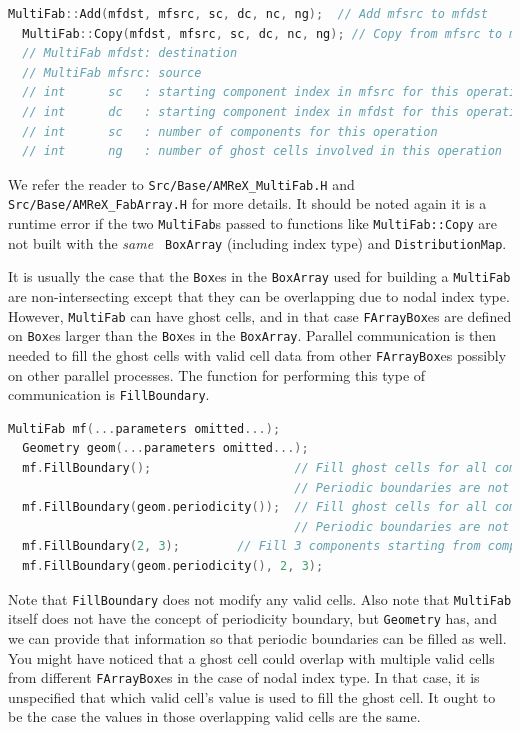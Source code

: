 {{{\begin{lstlisting}[language=cpp]
  MultiFab::Add(mfdst, mfsrc, sc, dc, nc, ng);  // Add mfsrc to mfdst
  MultiFab::Copy(mfdst, mfsrc, sc, dc, nc, ng); // Copy from mfsrc to mfdst
  // MultiFab mfdst: destination 
  // MultiFab mfsrc: source
  // int      sc   : starting component index in mfsrc for this operation
  // int      dc   : starting component index in mfdst for this operation
  // int      sc   : number of components for this operation
  // int      ng   : number of ghost cells involved in this operation
\end{lstlisting}
We refer the reader to {\tt Src/Base/AMReX\_MultiFab.H} and {\tt
  Src/Base/AMReX\_FabArray.H} for more details.  It should be noted
again it is a runtime error if the two {\tt MultiFab}s passed to functions
like {\tt MultiFab::Copy} are not built with the {\emph{same}} {\tt
  BoxArray} (including index type) and {\tt DistributionMap}. 

It is usually the case that the {\tt Box}es in the {\tt BoxArray} used
for building a {\tt MultiFab} are non-intersecting except that they
can be overlapping due to nodal index type.  However, {\tt MultiFab}
can have ghost cells, and in that case {\tt FArrayBox}es are defined
on {\tt Box}es larger than the {\tt Box}es in the {\tt BoxArray}.
Parallel communication is then needed to fill the ghost cells with
valid cell data from other {\tt FArrayBox}es possibly on other
parallel processes.  The function for performing this type of
communication is {\tt FillBoundary}.
\begin{lstlisting}[language=cpp]
  MultiFab mf(...parameters omitted...);
  Geometry geom(...parameters omitted...);
  mf.FillBoundary();                    // Fill ghost cells for all components
                                        // Periodic boundaries are not filled.
  mf.FillBoundary(geom.periodicity());  // Fill ghost cells for all components
                                        // Periodic boundaries are not filled.
  mf.FillBoundary(2, 3);        // Fill 3 components starting from component 2
  mf.FillBoundary(geom.periodicity(), 2, 3);
\end{lstlisting}
Note that {\tt FillBoundary} does not modify any valid cells.  Also
note that {\tt MultiFab} itself does not have the concept of
periodicity boundary, but {\tt Geometry} has, and we can provide that
information so that periodic boundaries can be filled as well.  You
might have noticed that a ghost cell could overlap with multiple valid
cells from different {\tt FArrayBox}es in the case of nodal index
type.  In that case, it is unspecified that which valid cell's value
is used to fill the ghost cell.  It ought to be the case the values in
those overlapping valid cells are the same.

}}}
